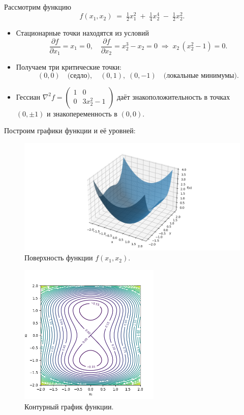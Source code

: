\documentclass[a4paper]{article}
\begin{document}
Рассмотрим функцию
\[
f(x_1, x_2) \;=\;\tfrac12 x_1^2 \;+\;\tfrac14 x_2^4 \;-\;\tfrac12 x_2^2.
\]

\begin{itemize}
  \item Стационарные точки находятся из условий
  \[
    \frac{\partial f}{\partial x_1}=x_1=0,
    \quad
    \frac{\partial f}{\partial x_2}=x_2^3 - x_2 = 0
    \;\Longrightarrow\;
    x_2\,(x_2^2-1)=0.
  \]
  \item Получаем три критические точки:
  \[
    (0,0)\quad\text{(седло)}, 
    \quad
    (0,1),\;(0,-1)\quad\text{(локальные минимумы)}.
  \]
  \item Гессиан
  \(\nabla^2 f=\begin{pmatrix}1&0\\0&3x_2^2-1\end{pmatrix}\)
  даёт знакоположительность в точках \((0,\pm1)\) и знакопеременность в \((0,0)\).
\end{itemize}

Построим графики функции и её уровней:
\begin{figure}[H]
  \centering
  \includegraphics[width=\textwidth]{images/task2_surf.png}
  \caption{Поверхность функции \(f(x_1,x_2)\).}
\end{figure}

\begin{figure}[H]
  \centering
  \includegraphics[width=0.6\textwidth]{images/task2_min.png}
  \caption{Контурный график функции.}
\end{figure}
\end{document}
